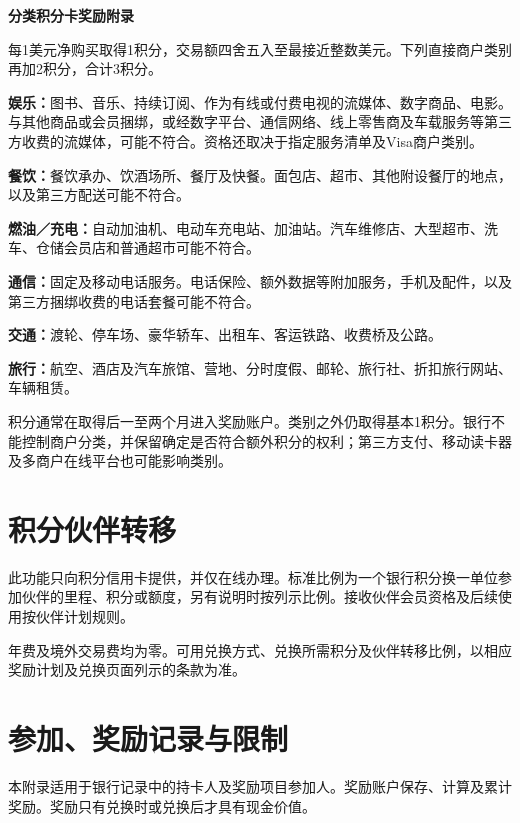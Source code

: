 \documentclass[UTF8,fontset=none,11pt,a4paper]{ctexart}
\begin{document}
{\noindent\fontsize{20}{25}\selectfont\bfseries 分类积分卡奖励附录\par}
\vspace{10pt}
每1美元净购买取得1积分，交易额四舍五入至最接近整数美元。下列直接商户类别再加2积分，合计3积分。


\textbf{娱乐：}图书、音乐、持续订阅、作为有线或付费电视的流媒体、数字商品、电影。与其他商品或会员捆绑，或经数字平台、通信网络、线上零售商及车载服务等第三方收费的流媒体，可能不符合。资格还取决于指定服务清单及Visa\allowbreak\mbox{商户类别。}


\textbf{餐饮：}餐饮承办、饮酒场所、餐厅及快餐。面包店、超市、其他附设餐厅的地点，以及第三方配送可\allowbreak\mbox{能不符合。}


\textbf{燃油／充电：}自动加油机、电动车充电站、加油站。汽车维修店、大型超市、洗车、仓储会员店和普通超市可\allowbreak\mbox{能不符合。}


\textbf{通信：}固定及移动电话服务。电话保险、额外数据等附加服务，手机及配件，以及第三方捆绑收费的电话套餐可\allowbreak\mbox{能不符合。}


\textbf{交通：}渡轮、停车场、豪华轿车、出租车、客运铁路、收费\allowbreak\mbox{桥及公路。}


\textbf{旅行：}航空、酒店及汽车旅馆、营地、分时度假、邮轮、旅行社、折扣旅行网站、\allowbreak\mbox{车辆租赁。}


积分通常在取得后一至两个月进入奖励账户。类别之外仍取得基本1积分。银行不能控制商户分类，并保留确定是否符合额外积分的权利；第三方支付、移动读卡器及多商户在线平台也可能\allowbreak\mbox{影响类别。}


\section*{积分伙伴转移}
此功能只向积分信用卡提供，并仅在线办理。标准比例为一个银行积分换一单位参加伙伴的里程、积分或额度，另有说明时按列示比例。接收伙伴会员资格及后续使用按伙伴\allowbreak\mbox{计划规则。}


年费及境外交易费均为零。可用兑换方式、兑换所需积分及伙伴转移比例，以相应奖励计划及兑换页面列示的\allowbreak\mbox{条款为准。}


\section*{参加、奖励记录与限制}
本附录适用于银行记录中的持卡人及奖励项目参加人。奖励账户保存、计算及累计奖励。奖励只有兑换时或兑换后才具有\allowbreak\mbox{现金价值。}
\end{document}
